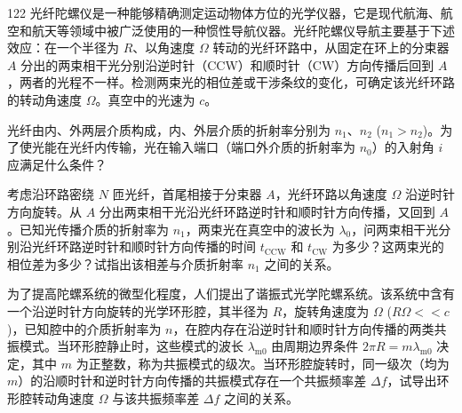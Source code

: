\begin{problem}[2020第37届全国中学生物理竞赛复赛][光纤陀螺仪Sagnac效应分析]{122}
    光纤陀螺仪是一种能够精确测定运动物体方位的光学仪器，它是现代航海、航空和航天等领域中被广泛使用的一种惯性导航仪器。光纤陀螺仪导航主要基于下述效应：在一个半径为 $R$、以角速度 $\Omega$ 转动的光纤环路中，从固定在环上的分束器 $A$ 分出的两束相干光分别沿逆时针（CCW）和顺时针（CW）方向传播后回到 $A$，两者的光程不一样。检测两束光的相位差或干涉条纹的变化，可确定该光纤环路的转动角速度 $\Omega$。真空中的光速为 $c$。
    \begin{subproblem}
        光纤由内、外两层介质构成，内、外层介质的折射率分别为 $n_{1}$、$n_{2}$ ($n_{1} > n_{2}$)。为了使光能在光纤内传输，光在输入端口（端口外介质的折射率为 $n_{0}$）的入射角 $i$ 应满足什么条件？
    \end{subproblem}
    \begin{subproblem}
        考虑沿环路密绕 $N$ 匝光纤，首尾相接于分束器 $A$，光纤环路以角速度 $\Omega$ 沿逆时针方向旋转。从 $A$ 分出两束相干光沿光纤环路逆时针和顺时针方向传播，又回到 $A$。已知光传播介质的折射率为 $n_{1}$，两束光在真空中的波长为 $\lambda_{0}$，问两束相干光分别沿光纤环路逆时针和顺时针方向传播的时间 $t_{\mathrm{CCW}}$ 和 $t_{\mathrm{CW}}$ 为多少？这两束光的相位差为多少？试指出该相差与介质折射率 $n_{1}$ 之间的关系。
    \end{subproblem}
    \begin{subproblem}
        为了提高陀螺系统的微型化程度，人们提出了谐振式光学陀螺系统。该系统中含有一个沿逆时针方向旋转的光学环形腔，其半径为 $R$，旋转角速度为 $\Omega$ ($R\Omega << c$)，已知腔中的介质折射率为 $n$，在腔内存在沿逆时针和顺时针方向传播的两类共振模式。当环形腔静止时，这些模式的波长 $\lambda_{\mathrm{m0}}$ 由周期边界条件 $2\pi R = m \lambda_{\mathrm{m0}}$ 决定，其中 $m$ 为正整数，称为共振模式的级次。当环形腔旋转时，同一级次（均为 $m$）的沿顺时针和逆时针方向传播的共振模式存在一个共振频率差 $\Delta f$，试导出环形腔转动角速度 $\Omega$ 与该共振频率差 $\Delta f$ 之间的关系。
    \end{subproblem}
\end{problem}
